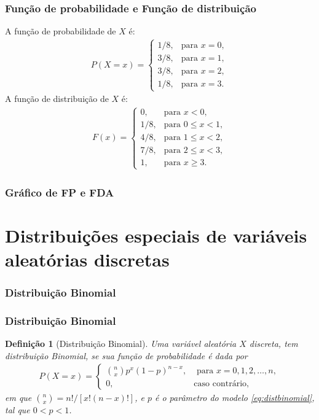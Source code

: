 \documentclass{beamer}
\theoremstyle{plain}
\newtheorem{defi}{Definição}
\begin{document}
\begin{frame}
	\frametitle{Função de probabilidade e Função de distribuição}
	A função de probabilidade de $X$ é:
	\begin{align*}
	P(X = x) = \left\{
	\begin{array}{ll}
	1/8, & \textrm{para } x = 0,\\
	3/8, & \textrm{para } x = 1,\\
	3/8, & \textrm{para } x = 2,\\
	1/8, & \textrm{para } x = 3. 	
	\end{array}
	\right.
	\end{align*}
	A função de distribuição de $X$ é:
	\begin{align*}
	F(x) = \left\{
	\begin{array}{ll}
	0, & \textrm{para } x < 0,\\
	1/8, & \textrm{para } 0 \leq x < 1,\\
	4/8, & \textrm{para } 1 \leq x < 2,\\
	7/8, & \textrm{para } 2 \leq x < 3,\\
	1, & \textrm{para } x \geq 3. 	
	\end{array}
	\right.
	\end{align*}
\end{frame}

\begin{frame}
	\frametitle{Gráfico de FP e FDA}
	\begin{center}
	\end{center}
\end{frame}

\section{Distribuições especiais de variáveis aleatórias discretas}

  \begin{frame}
  	\frametitle{Distribuição Binomial}
  	\begin{center}
  	\end{center}
  \end{frame}

  \begin{frame}
  	\frametitle{Distribuição Binomial}
  	\begin{defi}[Distribuição Binomial]
  		Uma variável aleatória $X$ discreta, tem distribuição Binomial, se sua função de probabilidade é dada por
  		\begin{eqnarray}\label{eq:distbinomial}
  		P(X=x)=\left\lbrace \begin{array}{ll}
  		\binom{n}{x}p^x(1-p)^{n-x},& \textrm{ para } x= 0,1,2,\ldots,n,\\
  		0,& \textrm{caso contrário},
  		\end{array}\right.
  		\end{eqnarray}
  		em que $\binom{n}{x}=n!/[x!(n-x)!]$, e $p$ é o parâmetro do modelo \eqref{eq:distbinomial}, tal que $0 < p < 1$.
  	\end{defi}
  \end{frame}
\end{document}
